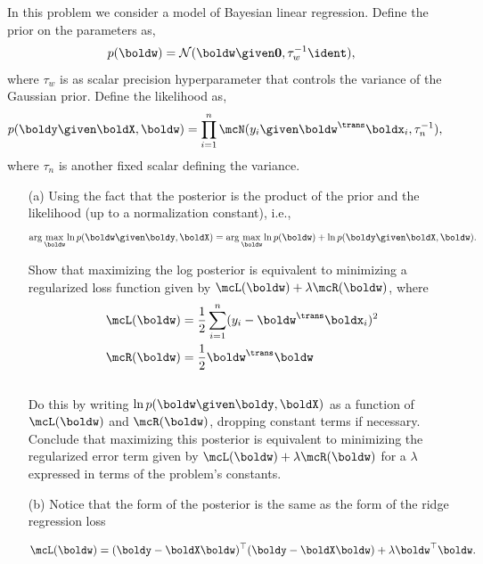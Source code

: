 \documentclass[submit]{harvardml}
\begin{document}
\begin{problem}
In this problem we consider a model of Bayesian linear regression. Define the prior on the parameters as,
\begin{align*}
p(\boldw) = \mathcal{N}(\boldw \given \bold0, \tau_w^{-1}\ident ),
\end{align*}
where $\tau_w$ is as scalar precision hyperparameter that controls the variance of the Gaussian prior.  Define the likelihood as,
\begin{align*}
p(\boldy \given \boldX, \boldw) &= \prod_{i=1}^n \mcN(y_i \given \boldw^\trans \boldx_i, \tau_n^{-1}),
\end{align*}
where $\tau_n$ is another fixed scalar defining the variance. \\

\begin{itemize}
\item[(a)] Using the fact that the posterior is the product of the prior and the likelihood (up to a normalization constant), i.e., 
\[\arg\max_{\boldw} \ln p(\boldw \given \boldy, \boldX)= \arg\max_{\boldw} \ln p(\boldw) + \ln p(\boldy \given \boldX, \boldw).\]

\noindent Show that maximizing the log posterior is equivalent to minimizing a regularized loss function given by ${\mcL(\boldw) + \lambda \mcR(\boldw)}$, where
\begin{align*}
\mcL(\boldw) &= \frac{1}{2}\sum_{i = 1}^n (y_i - \boldw^\trans \boldx_i)^2 \\
\mcR(\boldw) &= \frac{1}{2}\boldw^\trans \boldw
\end{align*} \\

Do this by writing $\ln p(\boldw \given \boldy, \boldX)$ as a function of $\mcL(\boldw)$ and $\mcR(\boldw)$, dropping constant terms if necessary.  Conclude that maximizing this posterior is equivalent to minimizing the regularized error term given by $\mcL(\boldw) + \lambda \mcR(\boldw)$ for a $\lambda$ expressed in terms of the problem's constants.  

\item[(b)] Notice that the form of the posterior is the same as the
  form of the ridge regression loss

\[\mcL(\boldw) = (\boldy - \boldX \boldw)^\top (\boldy - \boldX
\boldw) + \lambda \boldw^\top \boldw .\]


\end{itemize}
\end{problem}
\end{document}
